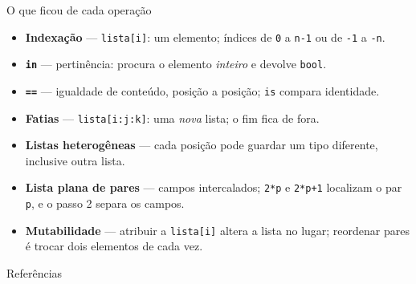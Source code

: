 \documentclass[aspectratio=169]{beamer}
\begin{document}
\begin{frame}{O que ficou de cada operação}
\begin{itemize}
  \item \textbf{Indexação} --- \texttt{lista[i]}: um elemento; índices de \texttt{0} a \texttt{n-1} ou de \texttt{-1} a \texttt{-n}.
  \item \textbf{\texttt{in}} --- pertinência: procura o elemento \emph{inteiro} e devolve \texttt{bool}.
  \item \textbf{\texttt{==}} --- igualdade de conteúdo, posição a posição; \texttt{is} compara identidade.
  \item \textbf{Fatias} --- \texttt{lista[i:j:k]}: uma \emph{nova} lista; o fim fica de fora.
  \item \textbf{Listas heterogêneas} --- cada posição pode guardar um tipo diferente, inclusive outra lista.
  \item \textbf{Lista plana de pares} --- campos intercalados; \texttt{2*p} e \texttt{2*p+1} localizam o par \texttt{p}, e o passo 2 separa os campos.
  \item \textbf{Mutabilidade} --- atribuir a \texttt{lista[i]} altera a lista no lugar; reordenar pares é trocar dois elementos de cada vez.
\end{itemize}
\end{frame}

\begin{frame}[allowframebreaks]{Referências}
  \nocite{*}
  
  
\end{frame}
\end{document}
